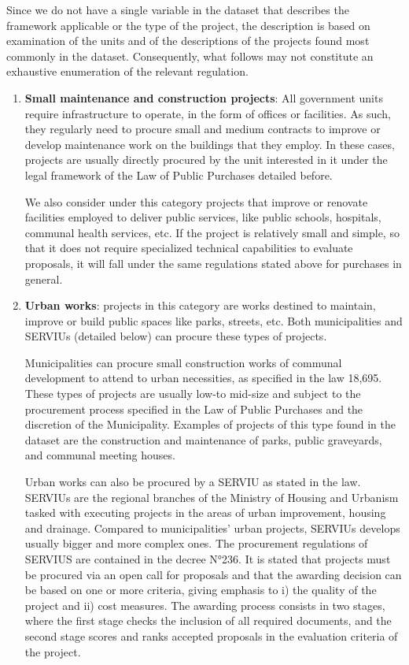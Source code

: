 Since we do not have a single variable in the dataset that describes the framework applicable or the type of the project, the description is based on examination of the units and of the descriptions of the projects found most commonly in the dataset. Consequently, what follows may not constitute an exhaustive enumeration of the relevant regulation.

\begin{enumerate}[wide, labelwidth=!,labelindent=0pt,label=\textbf{\arabic*}.]
\item \textbf{Small maintenance and construction projects}:
All government units require infrastructure to operate, in the form of offices or facilities. As such, they regularly need to procure small and medium contracts to improve or develop maintenance work on the buildings that they employ. In these cases, projects are usually directly procured by the unit interested in it under the legal framework of the Law of Public Purchases detailed before.

We also consider under this category projects that improve or renovate facilities employed to deliver public services, like public schools, hospitals, communal health services, etc. If the project is relatively small and simple, so that it does not require specialized technical capabilities to evaluate proposals, it will fall under the same regulations stated above for purchases in general.

\item \textbf{Urban works}: projects in this category are works destined to maintain, improve or build public spaces like parks, streets, etc. Both municipalities and SERVIUs (detailed below) can procure these types of projects.

Municipalities can procure small construction works of communal development to attend to urban necessities, as specified in the law 18,695. These types of projects are usually low-to mid-size and subject to the procurement process specified in the Law of Public Purchases and the discretion of the Municipality. Examples of projects of this type found in the dataset are the construction and maintenance of parks, public graveyards, and communal meeting houses.

Urban works can also be procured by a SERVIU as stated in the law. SERVIUs are the regional branches of the Ministry of Housing and Urbanism tasked with executing projects in the areas of urban improvement, housing and drainage. Compared to municipalities' urban projects, SERVIUs develops usually bigger and more complex ones. The procurement regulations of SERVIUS are contained in the decree N°236. It is stated that projects must be procured via an open call for proposals and that the awarding decision can be based on one or more criteria, giving emphasis to i) the quality of the project and ii) cost measures. The awarding process consists in two stages, where the first stage checks the inclusion of all required documents, and the second stage scores and ranks accepted proposals in the evaluation criteria of the project.


\end{enumerate}
